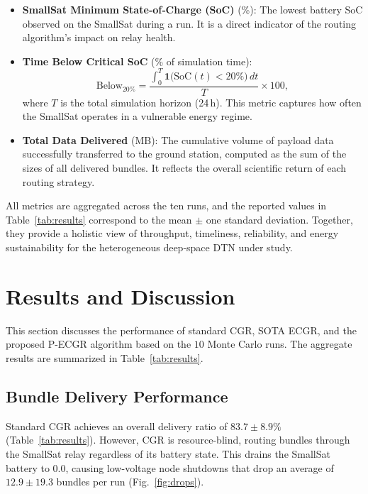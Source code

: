 \documentclass[journal,twocolumn]{IEEEtran}
\newcommand{\ecgr}{\textsf{ECGR}}
\newcommand{\cgr}{\textsf{CGR}}
\newcommand{\pecgr}{\textsf{P-ECGR}}
\begin{document}
\begin{itemize}
  \item \textbf{SmallSat Minimum State‑of‑Charge (SoC)} (\%):
        The lowest battery SoC observed on the SmallSat during a run.  It is a direct indicator of the routing algorithm’s impact on relay health.
  \item \textbf{Time Below Critical SoC} (\% of simulation time):
        \begin{equation}
          \text{Below}_{20\%}
          = \frac{\displaystyle\int_{0}^{T}
                 \mathbf{1}\bigl(\text{SoC}(t) < 20\%\bigr)\,dt}
                 {T}\times 100,
        \end{equation}
        where $T$ is the total simulation horizon (24 h).  This metric captures how often the SmallSat operates in a vulnerable energy regime.
  \item \textbf{Total Data Delivered} (MB):
        The cumulative volume of payload data successfully transferred to the ground station, computed as the sum of the sizes of all delivered bundles.  It reflects the overall scientific return of each routing strategy.
\end{itemize}
All metrics are aggregated across the ten runs, and the reported values in Table~\ref{tab:results} correspond to the mean $\pm$ one standard deviation.  Together, they provide a holistic view of throughput, timeliness, reliability, and energy sustainability for the heterogeneous deep‑space DTN under study.
\section{Results and Discussion}
\label{sec:results}

This section discusses the performance of standard \cgr{}, SOTA \ecgr{}, and the proposed \pecgr{} algorithm based on the $10$ Monte Carlo runs. The aggregate results are summarized in Table~\ref{tab:results}.



\subsection{Bundle Delivery Performance}
Standard \cgr{} achieves an overall delivery ratio of $83.7 \pm 8.9\%$ (Table~\ref{tab:results}). However, \cgr{} is resource-blind, routing bundles through the SmallSat relay regardless of its battery state. This drains the SmallSat battery to $0.0$, causing low-voltage node shutdowns that drop an average of $12.9 \pm 19.3$ bundles per run (Fig.~\ref{fig:drops}). 
\end{document}
